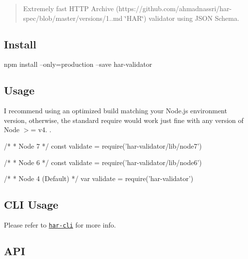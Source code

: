 \begin{quote}
Extremely fast H\+T\+TP Archive (https\+://github.com/ahmadnassri/har-\/spec/blob/master/versions/1..\+md \char`\"{}\+H\+A\+R\char`\"{}) validator using J\+S\+ON Schema. \end{quote}


\href{https://travis-ci.org/ahmadnassri/har-validator}{\tt } \href{https://www.npmjs.com/package/har-validator}{\tt } \href{https://codeclimate.com/github/ahmadnassri/har-validator}{\tt } \href{https://codeclimate.com/github/ahmadnassri/har-validator}{\tt } \href{https://dependencyci.com/github/ahmadnassri/har-validator}{\tt } \href{https://david-dm.org/ahmadnassri/har-validator}{\tt }

\subsection*{Install}


\begin{DoxyCode}
npm install --only=production --save har-validator
\end{DoxyCode}


\subsection*{Usage}

I recommend using an optimized build matching your Node.\+js environment version, otherwise, the standard {\ttfamily require} would work just fine with any version of Node {\ttfamily $>$= v4.} .


\begin{DoxyCode}
/*
 * Node 7
 */
const validate = require('har-validator/lib/node7')

/*
 * Node 6
 */
const validate = require('har-validator/lib/node6')

/*
 * Node 4 (Default)
 */
var validate = require('har-validator')
\end{DoxyCode}


\subsection*{C\+LI Usage}

Please refer to \href{https://github.com/ahmadnassri/har-cli}{\tt {\ttfamily har-\/cli}} for more info.

\subsection*{A\+PI}

